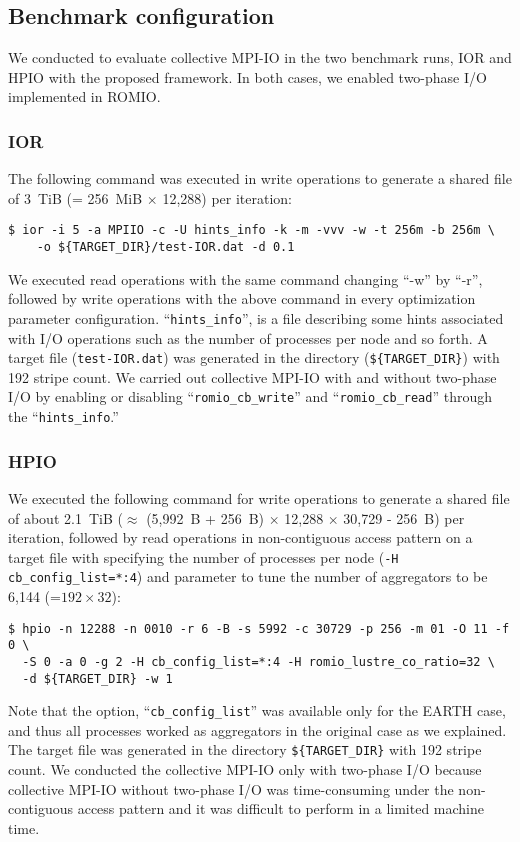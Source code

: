 \documentclass{jhps}
\begin{document}
\subsection{Benchmark configuration}

We conducted to evaluate collective MPI-IO in the two benchmark runs, IOR and HPIO
with the proposed framework.
In both cases, we enabled two-phase I/O implemented in ROMIO.

\subsubsection{IOR}
\label{ssec:IOR_CONFIG}

The following command was executed in write operations to generate
a shared file of 3~TiB (= 256~MiB $\times$ 12,288) per iteration:
%
\begin{verbatim}
$ ior -i 5 -a MPIIO -c -U hints_info -k -m -vvv -w -t 256m -b 256m \
    -o ${TARGET_DIR}/test-IOR.dat -d 0.1
\end{verbatim}
%
We executed read operations with the same command changing ``-w'' by ``-r'',
followed by write operations with the above command
in every optimization parameter configuration.
``{\tt hints\_info}'', is a file describing some hints associated with
I/O operations such as the number of processes per node and so forth.
A target file ({\tt test-IOR.dat}) was generated in the directory
({\tt \$\{TARGET\_DIR\}}) with 192 stripe count.
We carried out collective MPI-IO with and without two-phase I/O by enabling
or disabling ``{\tt romio\_cb\_write}'' and ``{\tt romio\_cb\_read}''
through the ``{\tt hints\_info}.''
%

\subsubsection{HPIO}
\label{ssec:HPIO_CONFIG}

We executed the following command for write operations to generate
a shared file of about 2.1~TiB ($\approx$ (5,992~B + 256~B) $\times$ 12,288 $\times$ 30,729 - 256~B)
per iteration, followed by read operations in non-contiguous access pattern
on a target file with specifying the number of processes per node ({\tt -H cb\_config\_list=*:4}) and parameter to tune the number of aggregators to be
6,144 (=$192 \times 32$):
%
\begin{verbatim}
$ hpio -n 12288 -n 0010 -r 6 -B -s 5992 -c 30729 -p 256 -m 01 -O 11 -f 0 \
  -S 0 -a 0 -g 2 -H cb_config_list=*:4 -H romio_lustre_co_ratio=32 \
  -d ${TARGET_DIR} -w 1
\end{verbatim}
%
Note that the option, ``{\tt cb\_config\_list}'' was available only for
the EARTH case, and thus all processes worked as aggregators
in the original case as we explained.
The target file was generated in the directory {\tt \$\{TARGET\_DIR\}}
with 192 stripe count. We conducted the collective MPI-IO
only with two-phase I/O because collective MPI-IO without two-phase I/O was
time-consuming under the non-contiguous access pattern and
it was difficult to perform in a limited machine time.
\end{document}
